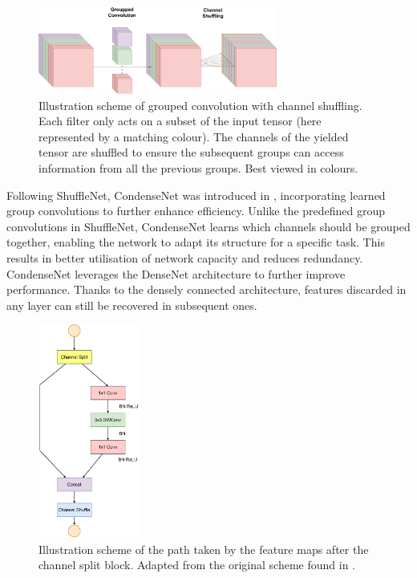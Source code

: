 \begin{figure}[htbp]
    \centering
    \includegraphics[width=0.70\textwidth]{chapter_sota/assets/group_conv_and_channel_shuffling.pdf}
    \caption{Illustration scheme of grouped convolution with channel shuffling.
    Each filter only acts on a subset of the input tensor (here represented by a
    matching colour). The channels of the yielded tensor are shuffled to ensure
    the subsequent groups can access information from all the previous groups.
    Best viewed in colours.}
    \label{fig:sota:shuffle_net}
\end{figure}

Following ShuffleNet, CondenseNet was introduced in \cite{huang2018condensenet},
incorporating learned group convolutions to further enhance efficiency. Unlike
the predefined group convolutions in ShuffleNet, CondenseNet learns which
channels should be grouped together, enabling the network to adapt its structure
for a specific task. This results in better utilisation of network capacity and
reduces redundancy. CondenseNet leverages the DenseNet architecture
\cite{huang2017densely} to further improve performance. Thanks to the densely
connected architecture, features discarded in any layer can still be recovered
in subsequent ones.\\

\begin{figure}[htbp]
    \centering
    \includegraphics[width=0.3\textwidth]{chapter_sota/assets/channel_split.pdf}
    \caption{Illustration scheme of the path taken by the feature maps after the
    channel split block. Adapted from the original scheme found in \cite{MaShuffleNetV2}.}
    \label{fig:sota:channel_split}
\end{figure}

